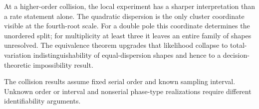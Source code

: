 At a higher-order collision, the local experiment has a sharper
interpretation than a rate statement alone.  The quadratic dispersion is the
only cluster coordinate visible at the fourth-root scale.  For a double pole
this coordinate determines the unordered split; for multiplicity at least
three it leaves an entire family of shapes unresolved.  The equivalence
theorem upgrades that likelihood collapse to total-variation
indistinguishability of equal-dispersion shapes and hence to a decision-
theoretic impossibility result.

The collision results assume fixed serial order and known sampling interval.
Unknown order or interval and nonserial phase-type realizations require
different identifiability arguments.

